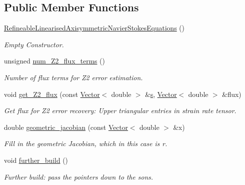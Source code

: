 \subsection*{Public Member Functions}
\begin{DoxyCompactItemize}
\item 
\hyperlink{classoomph_1_1RefineableLinearisedAxisymmetricNavierStokesEquations_a4b67d7a42af34fca4681b0a4e5e1caf8}{Refineable\+Linearised\+Axisymmetric\+Navier\+Stokes\+Equations} ()
\begin{DoxyCompactList}\small\item\em Empty Constructor. \end{DoxyCompactList}\item 
unsigned \hyperlink{classoomph_1_1RefineableLinearisedAxisymmetricNavierStokesEquations_a417329381693b43b4f29db62275e7d08}{num\+\_\+\+Z2\+\_\+flux\+\_\+terms} ()
\begin{DoxyCompactList}\small\item\em Number of \textquotesingle{}flux\textquotesingle{} terms for Z2 error estimation. \end{DoxyCompactList}\item 
void \hyperlink{classoomph_1_1RefineableLinearisedAxisymmetricNavierStokesEquations_ad15973ab4c2e2a53c6356b70ef954958}{get\+\_\+\+Z2\+\_\+flux} (const \hyperlink{classoomph_1_1Vector}{Vector}$<$ double $>$ \&\hyperlink{cfortran_8h_ab7123126e4885ef647dd9c6e3807a21c}{s}, \hyperlink{classoomph_1_1Vector}{Vector}$<$ double $>$ \&flux)
\begin{DoxyCompactList}\small\item\em Get \textquotesingle{}flux\textquotesingle{} for Z2 error recovery\+: Upper triangular entries in strain rate tensor. \end{DoxyCompactList}\item 
double \hyperlink{classoomph_1_1RefineableLinearisedAxisymmetricNavierStokesEquations_a6ac5e611a2b85e304329374a0a35cee0}{geometric\+\_\+jacobian} (const \hyperlink{classoomph_1_1Vector}{Vector}$<$ double $>$ \&x)
\begin{DoxyCompactList}\small\item\em Fill in the geometric Jacobian, which in this case is r. \end{DoxyCompactList}\item 
void \hyperlink{classoomph_1_1RefineableLinearisedAxisymmetricNavierStokesEquations_aed7750eee08d103a6872b4ef882c24cd}{further\+\_\+build} ()
\begin{DoxyCompactList}\small\item\em Further build\+: pass the pointers down to the sons. \end{DoxyCompactList}\end{DoxyCompactItemize}
